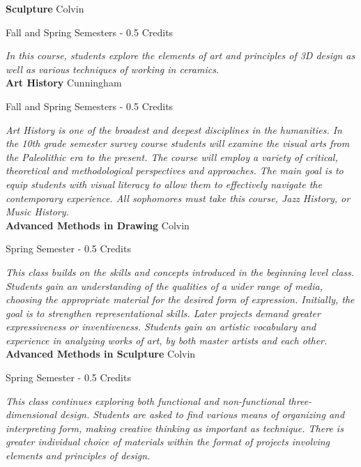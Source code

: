 \noindent\textbf{Sculpture} \hfill Colvin

\noindent Fall and Spring Semesters - 0.5 Credits

\vspace{1mm}\emph{In this course, students explore the elements of art and principles of 3D design as well as various techniques of working in ceramics.}\\

\noindent\textbf{Art History} \hfill Cunningham

\noindent Fall and Spring Semesters - 0.5 Credits

\vspace{1mm}\emph{Art History is one of the broadest and deepest disciplines in the humanities. In the 10th grade semester survey course students will examine the visual arts from the Paleolithic era to the present. The course will employ a variety of critical, theoretical and methodological perspectives and approaches. The main goal is to equip students with visual literacy to allow them to effectively navigate the contemporary experience.  All sophomores must take this course, Jazz History, or Music History.}\\

\noindent\textbf{Advanced Methods in Drawing} \hfill Colvin

\noindent Spring Semester - 0.5 Credits

\vspace{1mm}\emph{This class builds on the skills and concepts introduced in the beginning level class. Students gain an understanding of the qualities of a wider range of media, choosing the appropriate material for the desired form of expression. Initially, the goal is to strengthen representational skills. Later projects demand greater expressiveness or inventiveness. Students gain an artistic vocabulary and experience in analyzing works of art, by both master artists and each other.}\\

\noindent\textbf{Advanced Methods in Sculpture} \hfill Colvin

\noindent Spring Semester - 0.5 Credits

\vspace{1mm}\emph{This class continues exploring both functional and non-functional three-dimensional design. Students are asked to find various means of organizing and interpreting form, making creative thinking as important as technique. There is greater individual choice of materials within the format of projects involving elements and principles of design.}\\

